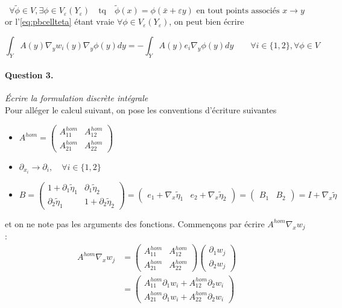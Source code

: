 \documentclass[11pt]{article}
\newcommand{\Ah}{A^{hom}}
\newcommand{\bx}{\bar{x}}
\newcommand{\teta}{\tilde{\eta}}
\newcommand{\tphi}{\tilde{\phi}}
\newcommand{\Ye}{Y_\varepsilon}
\newcommand{\question}[2]{\paragraph{Question #1.}\textit{#2} \\}
\begin{document}
\[
  \forall \tphi \in V, \exists \phi \in V_\varepsilon(\Ye) \quad \text{tq} \quad \tphi(x) =
  \phi(\bx+\varepsilon y) \text{ en tout points associés } x \rightarrow y
\]
or l'\autoref{eq:pbcellteta} étant vraie $\forall \phi \in V_\varepsilon(\Ye)$, on peut bien écrire 

\begin{equation}
  \int_{Y} A(y)\nabla_y w_i(y) \nabla_y \phi(y) dy =
  - \int_{Y} A(y) e_i \nabla_y \phi(y) dy \qquad \forall i \in \{1, 2\}, \forall \phi\in V
\end{equation}

\question{3}{Écrire la formulation discrète intégrale}
Pour alléger le calcul suivant, on pose les conventions d'écriture suivantes
\begin{itemize}
\item
  $ 
  \Ah = \left(
    \begin{matrix}
      \Ah_{11} & \Ah_{12} \\
      \Ah_{21} & \Ah_{22}
    \end{matrix}
  \right)
  $
\item $ \partial_{x_i} \rightarrow \partial_i, \quad \forall i \in\{1,2\}$  
\item 
  $
  B = \left(
    \begin{matrix}
      1+\partial_1 \teta_1 &   \partial_1 \teta_2 \\
        \partial_2 \teta_1 & 1+\partial_2 \teta_2
    \end{matrix}
  \right)
  = \left(
    \begin{matrix}
      e_1 + \nabla_x \teta_1 & e_2 + \nabla_x \teta_2
    \end{matrix}
  \right)
  = \left(
    \begin{matrix}
      B_1 & B_2
    \end{matrix}
  \right)
  = I + \nabla_x \teta
  $
\end{itemize}
et on ne note pas les arguments des fonctions.
Commençons par écrire $\Ah\nabla_x w_j$ :
\begin{equation}
  \begin{aligned}
    \Ah\nabla_x w_j &=
    \left(
      \begin{matrix}
        \Ah_{11} & \Ah_{12} \\
        \Ah_{21} & \Ah_{22}
      \end{matrix}
    \right)
    \left(
      \begin{matrix}
        \partial_1 w_j \\
        \partial_2 w_j
      \end{matrix}
    \right) \\
    &=
    \left(
      \begin{matrix}
        \Ah_{11} \partial_1 w_i + \Ah_{12} \partial_2 w_i \\
        \Ah_{21} \partial_1 w_i + \Ah_{22} \partial_2 w_i 
      \end{matrix}
    \right)
  \end{aligned}
\end{equation}
\end{document}
